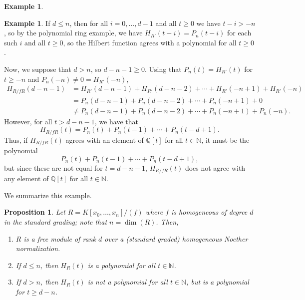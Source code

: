 \documentclass{amsart}[12pt]
\def\ann{\operatorname{ann}}
\newcommand{\Q}{\mathbb{Q}}
\newcommand{\ZZ}{\mathbb{Z}}
\newcommand{\NN}{\mathbb{N}}
\numberwithin{equation}{section}
\theoremstyle{plain} %
\newtheorem{proposition}[equation]{Proposition}
\theoremstyle{definition}
\newtheorem{ex}[equation]{Example}
\newtheorem{example}[equation]{Example}
\newtheorem{exer}[equation]{Optional Exercise}
\theoremstyle{remark}
\begin{document}
\begin{ex}
\begin{example}
If $d\leq n$, then for all $i=0,\dots,d-1$ and all $t\geq 0$ we have $t-i >-n$, so by the polynomial ring example, we have $H_{R'}(t-i)=P_n(t-i)$ for each such $i$ and all $t\geq 0$, so the Hilbert function agrees with a polynomial for all $t\geq 0$.

Now, we suppose that $d>n$, so  $d-n-1\geq 0$. Using that $P_n(t)=H_{R'}(t)$ for $t\geq -n$ and $P_n(-n)\neq 0 = H_{R'}(-n)$,
\[\begin{aligned} H_{R/fR}(d-n-1)&= H_{R'}(d-n-1) + H_{R'}(d-n-2) + \cdots + H_{R'}(-n+1)  + H_{R'}(-n) \\
&= P_n(d-n-1) + P_n(d-n-2) + \cdots + P_n(-n+1) +0 \\
&\neq  P_n(d-n-1) + P_n(d-n-2) + \cdots + P_n(-n+1) +P_n(-n). \end{aligned}\]
However, for all $t>d-n-1$, we have that
\[ H_{R/fR}(t) = P_n(t) + P_n(t-1) + \cdots + P_n(t-d+1).\]
Thus, if $H_{R/fR}(t)$ agrees with an element of $\Q[t]$ for all $t\in \NN$, it must be the polynomial \[P_n(t) + P_n(t-1) + \cdots + P_n(t-d+1),\] but since these are not equal for $t=d-n-1$, $H_{R/fR}(t)$ does not agree with any element of $\Q[t]$ for all $t\in \NN$.
\end{example}



We summarize this example.

\begin{proposition}
	Let $R=K[x_0,\dots,x_n]/(f)$ where $f$ is homogeneous of degree $d$ in the standard grading; note that $n=\dim(R)$. Then,
	\begin{enumerate}
		\item $R$ is a free module of rank $d$ over a (standard graded) homogeneous Noether normalization.
		\item If $d\leq n$, then $H_R(t)$ is a polynomial for all $t\in \NN$.
		\item If $d > n$, then $H_R(t)$ is not a polynomial for all $t \in \NN$, but is a polynomial for $t\geq d-n$.
	\end{enumerate}
\end{proposition}


\begin{comment}


Out next big goal is to prove that the Hilbert function of a graded module is always eventually equal to a polynomial. We need more graded analogues of tools from earlier.

\begin{exer} If $R$ is a Noetherian $\NN$-graded ring and $M$ is a nonzero $\ZZ$-graded module, then $M$ has a homogeneous associated prime.
\end{exer}
You may want to consider $\{ \ann_R(m) \ | \ m\in M \smallsetminus 0 \ \text{homogeneous}\}$. 


\end{comment}
\end{ex}
\end{document}
